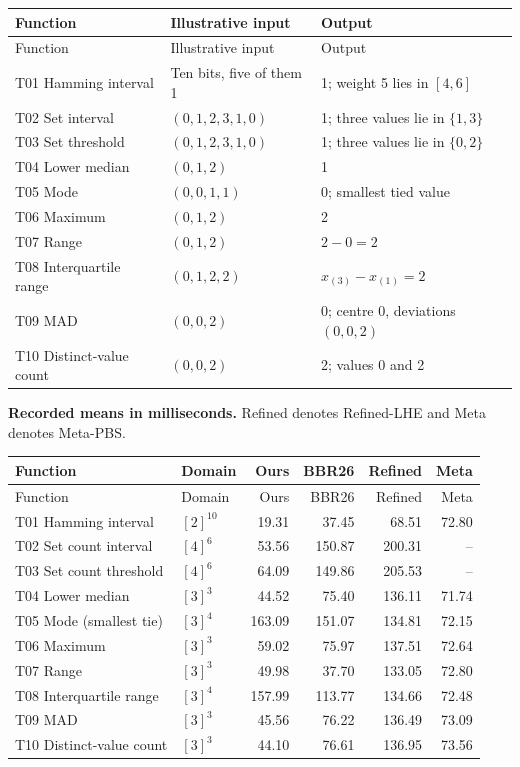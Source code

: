 \documentclass[a4paper,10pt]{article}
\begin{document}
\begin{longtable}{@{}p{47mm}p{51mm}p{62mm}@{}}
\toprule
Function & Illustrative input & Output\\\midrule
\endfirsthead
\toprule
Function & Illustrative input & Output\\\midrule
\endhead
T01 Hamming interval & Ten bits, five of them 1 & 1; weight 5 lies in $[4,6]$\\
T02 Set interval & $(0,1,2,3,1,0)$ & 1; three values lie in $\{1,3\}$\\
T03 Set threshold & $(0,1,2,3,1,0)$ & 1; three values lie in $\{0,2\}$\\
T04 Lower median & $(0,1,2)$ & 1\\
T05 Mode & $(0,0,1,1)$ & 0; smallest tied value\\
T06 Maximum & $(0,1,2)$ & 2\\
T07 Range & $(0,1,2)$ & $2-0=2$\\
T08 Interquartile range & $(0,1,2,2)$ & $x_{(3)}-x_{(1)}=2$\\
T09 MAD & $(0,0,2)$ & 0; centre 0, deviations $(0,0,2)$\\
T10 Distinct-value count & $(0,0,2)$ & 2; values 0 and 2\\
\bottomrule\end{longtable}
\textbf{Recorded means in milliseconds.} Refined denotes Refined-LHE and Meta denotes Meta-PBS.\par
\begin{longtable}{@{}p{56mm}lrrrr@{}}
\toprule
Function & Domain & Ours & BBR26 & Refined & Meta\\\midrule
\endfirsthead
\toprule
Function & Domain & Ours & BBR26 & Refined & Meta\\\midrule
\endhead
T01 Hamming interval & $[2]^{10}$ & 19.31 & 37.45 & 68.51 & 72.80\\
T02 Set count interval & $[4]^{6}$ & 53.56 & 150.87 & 200.31 & --\\
T03 Set count threshold & $[4]^{6}$ & 64.09 & 149.86 & 205.53 & --\\
T04 Lower median & $[3]^{3}$ & 44.52 & 75.40 & 136.11 & 71.74\\
T05 Mode (smallest tie) & $[3]^{4}$ & 163.09 & 151.07 & 134.81 & 72.15\\
T06 Maximum & $[3]^{3}$ & 59.02 & 75.97 & 137.51 & 72.64\\
T07 Range & $[3]^{3}$ & 49.98 & 37.70 & 133.05 & 72.80\\
T08 Interquartile range & $[3]^{4}$ & 157.99 & 113.77 & 134.66 & 72.48\\
T09 MAD & $[3]^{3}$ & 45.56 & 76.22 & 136.49 & 73.09\\
T10 Distinct-value count & $[3]^{3}$ & 44.10 & 76.61 & 136.95 & 73.56\\
\bottomrule\end{longtable}
\end{document}
